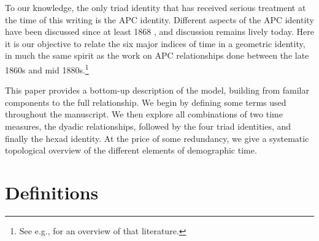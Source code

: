 \documentclass[11pt,oneside,a4paper]{article} %
\begin{document}
To our knowledge, the only triad identity that has received serious
treatment at the time of this writing is the APC identity. Different
aspects of the APC identity have been discussed since at least 1868
\citep{knapp1868ermittlung}, and discussion remains lively today. Here it is our
objective to relate the six major indices of time in a geometric identity, in
much the same spirit as the work on APC relationships done between the late
1860s and mid 1880s.\footnote{See e.g., \citet{keiding2011age} for an overview of that literature.} 

This paper provides a bottom-up description of the model, building from familar
components to the full relationship. We begin by defining some terms used
throughout the manuscript. We then explore all combinations of two time
measures, the dyadic relationships, followed by the four triad identities, and
finally the hexad identity. At the price of some redundancy, we give a systematic topological overview of the
different elements of demographic time. 

\section*{Definitions}
\end{document}
